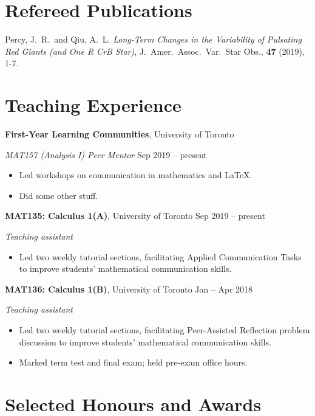 \documentclass[letterpaper, 11pt]{aq-cv}
\begin{document}
\section*{Refereed Publications}

Percy, J.\ R.\ and Qiu, A.\ L. \textit{Long-Term Changes in the Variability of Pulsating Red Giants (and One R CrB Star)}, J.\ Amer.\ Assoc.\ Var.\ Star Obs., \textbf{47} (2019), 1-7.

\section*{Teaching Experience}

\textbf{First-Year Learning Communities}, University of Toronto

\textsl{MAT157 (Analysis I) Peer Mentor} \hfill Sep 2019 -- present
\begin{itemize}[noitemsep, topsep=0pt]
    \item Led workshops on communication in mathematics and \LaTeX{}.
    \item Did some other stuff.
\end{itemize}\vspace{1ex}
\textbf{MAT135: Calculus 1(A)}, University of Toronto \hfill Sep 2019 -- present

\textsl{Teaching assistant}
\begin{itemize}[noitemsep, topsep=0pt]
    \item Led two weekly tutorial sections, facilitating Applied Communication Tasks to improve students' mathematical communication skills.
\end{itemize}\vspace{1ex}
\textbf{MAT136: Calculus 1(B)}, University of Toronto \hfill Jan -- Apr 2018

\textsl{Teaching assistant}
\begin{itemize}[noitemsep, topsep=0pt]
    \item Led two weekly tutorial sections, facilitating Peer-Assisted Reflection problem discussion to improve students' mathematical communication skills.

    \item Marked term test and final exam; held pre-exam office hours.
\end{itemize}

\section*{Selected Honours and Awards}
\end{document}
